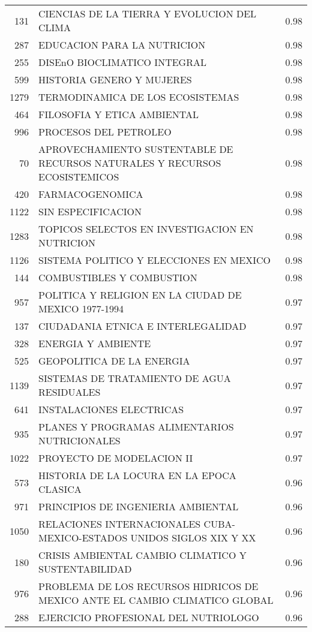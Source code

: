 \documentclass[12pt]{article}
\begin{document}
\begin{table}[ht]
\begin{tabular}{rlr}
  131 & CIENCIAS DE LA TIERRA Y EVOLUCION DEL CLIMA & 0.98 \\ 
  287 & EDUCACION PARA LA NUTRICION & 0.98 \\ 
  255 & DISEnO BIOCLIMATICO INTEGRAL & 0.98 \\ 
  599 & HISTORIA GENERO Y MUJERES & 0.98 \\ 
  1279 & TERMODINAMICA DE LOS ECOSISTEMAS & 0.98 \\ 
  464 & FILOSOFIA Y ETICA AMBIENTAL & 0.98 \\ 
  996 & PROCESOS DEL PETROLEO & 0.98 \\ 
  70 & APROVECHAMIENTO SUSTENTABLE DE RECURSOS NATURALES Y RECURSOS ECOSISTEMICOS & 0.98 \\ 
  420 & FARMACOGENOMICA & 0.98 \\ 
  1122 & SIN ESPECIFICACION & 0.98 \\ 
  1283 & TOPICOS SELECTOS EN INVESTIGACION EN NUTRICION & 0.98 \\ 
  1126 & SISTEMA POLITICO Y ELECCIONES EN MEXICO & 0.98 \\ 
  144 & COMBUSTIBLES Y COMBUSTION & 0.98 \\ 
  957 & POLITICA Y RELIGION EN LA CIUDAD DE MEXICO 1977-1994 & 0.97 \\ 
  137 & CIUDADANIA ETNICA E INTERLEGALIDAD & 0.97 \\ 
  328 & ENERGIA Y AMBIENTE & 0.97 \\ 
  525 & GEOPOLITICA DE LA ENERGIA & 0.97 \\ 
  1139 & SISTEMAS DE TRATAMIENTO DE AGUA RESIDUALES & 0.97 \\ 
  641 & INSTALACIONES ELECTRICAS & 0.97 \\ 
  935 & PLANES Y PROGRAMAS ALIMENTARIOS NUTRICIONALES & 0.97 \\ 
  1022 & PROYECTO DE MODELACION II & 0.97 \\ 
  573 & HISTORIA DE LA LOCURA EN LA EPOCA CLASICA & 0.96 \\ 
  971 & PRINCIPIOS DE INGENIERIA AMBIENTAL & 0.96 \\ 
  1050 & RELACIONES INTERNACIONALES CUBA-MEXICO-ESTADOS UNIDOS SIGLOS XIX Y XX & 0.96 \\ 
  180 & CRISIS AMBIENTAL CAMBIO CLIMATICO Y SUSTENTABILIDAD & 0.96 \\ 
  976 & PROBLEMA DE LOS RECURSOS HIDRICOS DE MEXICO ANTE EL CAMBIO CLIMATICO GLOBAL & 0.96 \\ 
  288 & EJERCICIO PROFESIONAL DEL NUTRIOLOGO & 0.96 \\ 

\end{tabular}
\end{table}
\end{document}
